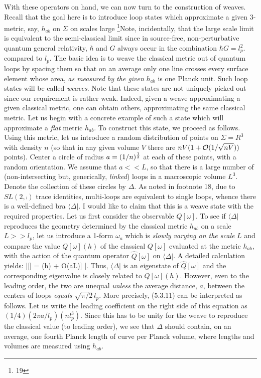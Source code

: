 With these operators on hand, we can now turn to the construction of
weaves. Recall that the goal here is to introduce loop states which
approximate a given 3-metric, say, $h_{ab}$ on $\Sigma$ on scales large
\footnote{19}{Note, incidentally, that the large scale limit is equivalent to
the semi-classical limit since in source-free, non-perturbative quantum
general relativity, $\hbar$ and $G$ always occur in the combination
$\hbar G = l_p^2$.}
compared to $l_p$. The basic idea is to weave the classical metric out of
quantum loops by spacing them so that on an average only one line crosses
every surface element whose area, {\it as measured by the given} $h_{ab}$
is one Planck unit. Such loop states will be called {\it weaves}. Note that
these states are not uniquely picked out since our requirement is rather weak.
Indeed, given a weave approximating a given classical metric, one can obtain
others, approximating the same classical metric. Let us begin with a concrete
example of such a state which will approximate a {\it flat} metric $h_{ab}$.
To construct this state, we proceed as follows. Using this metric, let us
introduce a random distribution of points on $\Sigma = R^3$ with density $n$
(so that in any given volume $V$ there are $nV(1+ {\cal O}(1/\sqrt{nV}))$
points). Center a circle of radius $a = (1/n)^{1\over 3}$ at each of these
points, with a random orientation. We assume that $a<< L$, so that there is a
large number of (non-intersecting but, generically, {\it linked}) loops in a
macroscopic volume $L^3$. Denote the collection of these circles by $\Delta$.
As noted in footnote 18, due to $SL(2,\comp )$ trace identities, multi-loops
are equivalent to single loops, whence there is a well-defined bra $\langle
\Delta|$. I would like to claim that this is a weave state with the required
properties. Let us first consider the observable $\hat{Q}[\omega]$. To see if
$\langle\Delta |$ reproduces the geometry determined by the classical metric
$h_{ab}$ on a scale $L>>l_p$, let us introduce a 1-form $\omega_a$ which is
{\it slowly varying on the scale} $L$ and compare the value $Q[\omega](h)$
of the classical $Q[\omega]$ evaluated at the metric $h_{ab}$, with the action
of the quantum operator $\hat{Q}[\omega]$ on $\langle\Delta|$. A detailed
calculation yields:
\bneq
\langle\Delta|\circ {}[\omega] =  \left[{\pi\over 2} \- \
({l_p\over a})^2 \, Q[w](h) + {\cal O}({a\over L})\right]\-  \cdot
\langle\Delta|.
Thus, $\langle\Delta|$ is an eigenstate of $\hat{Q}[\omega ]$ and the
corresponding eigenvalue is closely related to $Q[\omega](h)$. However, even
to the leading order, the two are unequal {\it unless} the average distance,
$a$, between the centers of loops {\it equals} $\sqrt{\pi/2}\, l_p$. More
precisely,  (5.3.11) can be interpreted as follows. Let us write the leading
coefficient on the right side of this equation as $(1/4)(2\pi a/l_p)(nl_p^3)$.
Since this has to be unity for the weave to reproduce the classical value (to
leading order), we see that $\Delta$ should  contain, on an average, one
fourth Planck length of curve per Planck volume, where lengths and volumes are
measured using $h_{ab}$.

